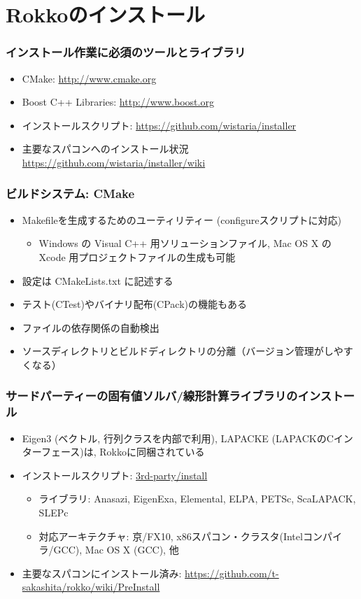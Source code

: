 \section{Rokkoのインストール}

\begin{frame}
  \frametitle{インストール作業に必須のツールとライブラリ}
  \begin{itemize}
    \setlength{\itemsep}{1em}
  \item CMake: \url{http://www.cmake.org}
  \item Boost C++ Libraries: \url{http://www.boost.org}
  \item インストールスクリプト: \url{https://github.com/wistaria/installer}
  \item 主要なスパコンへのインストール状況 \\
    \url{https://github.com/wistaria/installer/wiki}
  \end{itemize}
\end{frame}

\begin{frame}
  \frametitle{ビルドシステム: CMake}
  \begin{itemize}
    \setlength{\itemsep}{1em}
  \item Makefileを生成するためのユーティリティー (configureスクリプトに対応)
    \begin{itemize}
    \item Windows の Visual C++ 用ソリューションファイル, Mac OS X の Xcode 用プロジェクトファイルの生成も可能
    \end{itemize}
  \item 設定は CMakeLists.txt に記述する
  \item テスト(CTest)やバイナリ配布(CPack)の機能もある
  \item ファイルの依存関係の自動検出
  \item ソースディレクトリとビルドディレクトリの分離（バージョン管理がしやすくなる）
  \end{itemize}
\end{frame}

\begin{frame}
  \frametitle{サードパーティーの固有値ソルバ/線形計算ライブラリのインストール}
  \begin{itemize}
    \setlength{\itemsep}{1em}
  \item Eigen3 (ベクトル, 行列クラスを内部で利用), LAPACKE (LAPACKのCインターフェース)は, Rokkoに同梱されている
  \item インストールスクリプト: \href{https://github.com/t-sakashita/rokko/tree/master/3rd-party/install}{3rd-party/install}
    \begin{itemize}
      \item ライブラリ: Anasazi, EigenExa, Elemental, ELPA, PETSc, ScaLAPACK, SLEPc
      \item 対応アーキテクチャ: 京/FX10, x86スパコン・クラスタ(Intelコンパイラ/GCC), Mac OS X (GCC), 他
    \end{itemize}
  \item 主要なスパコンにインストール済み: \url{https://github.com/t-sakashita/rokko/wiki/PreInstall}
  \end{itemize}
\end{frame}

